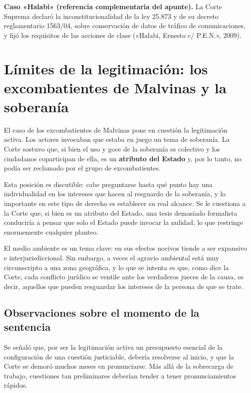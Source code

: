 \documentclass[12pt,oneside]{book}
\begin{document}
\begin{note}
\textbf{Caso «Halabi» (referencia complementaria del apunte).} La Corte Suprema declaró la inconstitucionalidad de la ley 25.873 y de su decreto reglamentario 1563/04, sobre conservación de datos de tráfico de comunicaciones, y fijó los requisitos de las acciones de clase («Halabi, Ernesto c/ P.E.N.», 2009).
\end{note}

\section{Límites de la legitimación: los excombatientes de Malvinas y la soberanía}

El caso de los excombatientes de Malvinas pone en cuestión la legitimación activa. Los actores invocaban que estaba en juego un tema de soberanía. La Corte sostuvo que, si bien el uso y goce de la soberanía es colectivo y los ciudadanos coparticipan de ella, es un \textbf{atributo del Estado} y, por lo tanto, no podía ser reclamado por el grupo de excombatientes.

Esta posición es discutible: cabe preguntarse hasta qué punto hay una individualidad en los intereses que hacen al resguardo de la soberanía, y lo importante en este tipo de derecho es establecer su real alcance. Se le cuestiona a la Corte que, si bien es un atributo del Estado, una tesis demasiado formalista conduciría a pensar que solo el Estado puede invocar la nulidad, lo que restringe enormemente cualquier planteo.

El medio ambiente es un tema clave: en sus efectos nocivos tiende a ser expansivo e interjurisdiccional. Sin embargo, a veces el agravio ambiental está muy circunscripto a una zona geográfica, y lo que se intenta es que, como dice la Corte, cada conflicto jurídico se ventile ante los verdaderos jueces de la causa, es decir, aquellos que pueden resguardar los intereses de la persona de que se trate.

\subsection{Observaciones sobre el momento de la sentencia}

Se señaló que, por ser la legitimación activa un presupuesto esencial de la configuración de una cuestión justiciable, debería resolverse al inicio, y que la Corte se demoró muchos meses en pronunciarse. Más allá de la sobrecarga de trabajo, cuestiones tan preliminares deberían tender a tener pronunciamientos rápidos.
\end{document}

